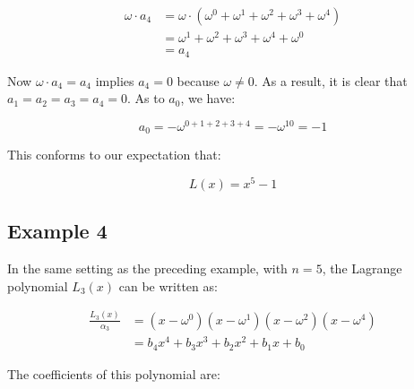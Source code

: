\documentclass[a4paper]{article}
\begin{document}
\begin{equation}
  \begin{aligned}
   \omega \cdot a_4 &= \omega \cdot (\omega^0 + \omega^1 + \omega^2 + \omega^3 + \omega^4) \\
                    &= \omega^1 + \omega^2 + \omega^3 + \omega^4 + \omega^0 \\
                    &= a_4
  \end{aligned}
\end{equation}

Now $\omega \cdot a_4 = a_4$ implies $a_4 = 0$ because $\omega \neq 0$. As a result, it is clear that $a_1 = a_2 = a_3 = a_4 = 0$. As to $a_0$, we have:

\begin{equation}
  a_0 = -\omega^{0+1+2+3+4} = -\omega^{10}  = -1
\end{equation}

This conforms to our expectation that:

\begin{equation}
  L(x) = x^5 - 1
\end{equation}



\subsection{Example 4}

In the same setting as the preceding example, with $n = 5$, the Lagrange polynomial $L_3(x)$ can be written as:

\begin{equation}
  \begin{aligned}
   \frac{L_3(x)}{\alpha_3} &= (x - \omega^0)(x - \omega^1)(x - \omega^2)(x - \omega^4) \\
        &= b_4 x^4 + b_3 x^3 + b_2 x^2 + b_1 x + b_0
  \end{aligned}
\end{equation}

The coefficients of this polynomial are:
\end{document}
